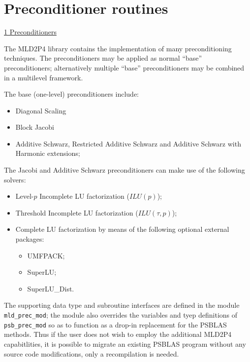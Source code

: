 \section{Preconditioner routines}
\label{sec:precs}
         {\underline{\ref{sec:precs} Preconditioners}}

\label{sec:psprecs}
The MLD2P4 library  contains the implementation of many preconditioning
techniques. The preconditioners may be applied as normal ``base'' 
preconditioners; alternatively multiple ``base'' preconditioners may
be combined  in a multilevel framework. 

The base (one-level) preconditioners include: 
\begin{itemize}
\item Diagonal Scaling
\item Block Jacobi 
\item Additive Schwarz, Restricted Additive Schwarz and
  Additive Schwarz with Harmonic extensions;
\end{itemize}
The Jacobi and Additive Schwarz preconditioners can make use of the
following solvers:
\begin{itemize}
\item Level-$p$ Incomplete LU factorization ($ILU(p)$);
\item Threshold Incomplete LU factorization ($ILU(\tau,p)$);
\item Complete LU factorization by means of the following optional
  external   packages: 
\begin{itemize}
\item UMFPACK;
\item SuperLU;
\item SuperLU\_Dist.
\end{itemize}
\end{itemize}

The supporting data type and subroutine interfaces are defined in the
module  \verb|mld_prec_mod|; the module also overrides the variables
and tyep definitions of \verb|psb_prec_mod| so as to function as a
drop-in replacement for the PSBLAS methods. Thus if the user does not
wish to employ the additional MLD2P4 capabitlities, it is possible to
migrate an existing PSBLAS program without any source code
modifications, only a recompilation is needed. 


